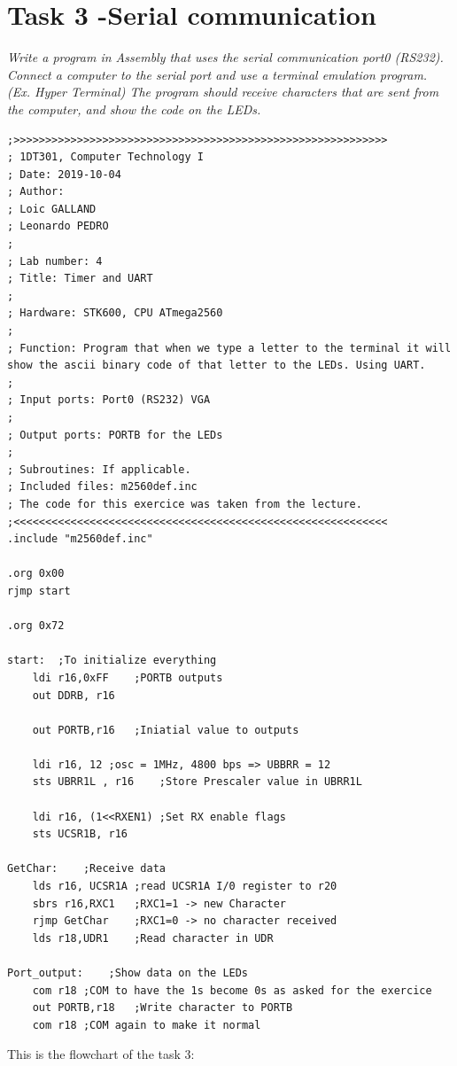 \documentclass[a4paper,12pt]{article}
\begin{document}
\newpage
\section{Task 3 -Serial communication}
\textit{Write a program in Assembly that uses the serial communication port0 (RS232). Connect a
computer to the serial port and use a terminal emulation program. (Ex. Hyper Terminal)
The program should receive characters that are sent from the computer, and show the code on
the LEDs.}

\lstset{style=Asm}
\begin{lstlisting}
;>>>>>>>>>>>>>>>>>>>>>>>>>>>>>>>>>>>>>>>>>>>>>>>>>>>>>>>>>>>
; 1DT301, Computer Technology I
; Date: 2019-10-04
; Author:
; Loic GALLAND
; Leonardo PEDRO
;
; Lab number: 4
; Title: Timer and UART
;
; Hardware: STK600, CPU ATmega2560
;
; Function: Program that when we type a letter to the terminal it will show the ascii binary code of that letter to the LEDs. Using UART.
; 
; Input ports: Port0 (RS232) VGA 
;
; Output ports: PORTB for the LEDs 
;
; Subroutines: If applicable.
; Included files: m2560def.inc
; The code for this exercice was taken from the lecture.
;<<<<<<<<<<<<<<<<<<<<<<<<<<<<<<<<<<<<<<<<<<<<<<<<<<<<<<<<<<<
.include "m2560def.inc"

.org 0x00
rjmp start

.org 0x72

start:	;To initialize everything
	ldi r16,0xFF	;PORTB outputs
	out DDRB, r16
	
	out PORTB,r16	;Iniatial value to outputs

	ldi r16, 12	;osc = 1MHz, 4800 bps => UBBRR = 12
	sts UBRR1L , r16	;Store Prescaler value in UBRR1L

	ldi r16, (1<<RXEN1)	;Set RX enable flags 
	sts UCSR1B, r16

GetChar:	;Receive data
	lds r16, UCSR1A	;read UCSR1A I/0 register to r20
	sbrs r16,RXC1	;RXC1=1 -> new Character
	rjmp GetChar	;RXC1=0 -> no character received
	lds r18,UDR1	;Read character in UDR

Port_output:	;Show data on the LEDs
	com r18	;COM to have the 1s become 0s as asked for the exercice
	out PORTB,r18	;Write character to PORTB 
	com r18	;COM again to make it normal 
\end{lstlisting}

\newpage
This is the flowchart of the task 3:
\begin{center}
\end{center}
\begin{center}
\end{center}
\end{document}
